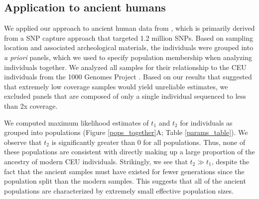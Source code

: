 \documentclass[11pt, oneside]{article}   	%
\begin{document}
\subsection{Application to ancient humans}
We applied our approach to ancient human data from \citet{mathieson2015genome}, which is primarily derived from a SNP capture approach that targeted 1.2 million SNPs. Based on sampling location and associated archeological materials, the individuals were grouped into \emph{a priori} panels, which we used to specify population membership when analyzing individuals together. We analyzed all samples for their relationship to the CEU individuals from the 1000 Genomes Project \citep{10002015global}. Based on our results that suggested that extremely low coverage samples would yield unreliable estimates, we excluded panels that are composed of only a single individual sequenced to less than 2x coverage.

We computed maximum likelihood estimates of $t_1$ and $t_2$ for individuals as grouped into populations (Figure \ref{pops_together}A; Table \ref{params_table}). We observe that $t_2$ is significantly greater than 0 for all populations. Thus, none of these populations are consistent with directly making up a large proportion of the ancestry of modern CEU individuals. Strikingly, we see that $t_2 \gg t_1$, despite the fact that the ancient samples must have existed for fewer generations since the population split than the modern samples. This suggests that all of the ancient populations are characterized by extremely small effective population sizes.
\end{document}
